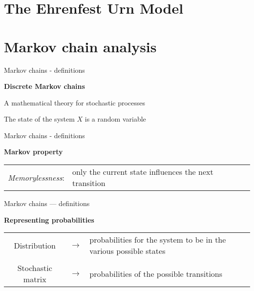 \documentclass[usenames,dvipsnames]{beamer}
\begin{document}
  \section{The Ehrenfest Urn Model}
  

  
  \section{Markov chain analysis}
  \begin{frame}{Markov chains - definitions}
    \begin{center}
      \Large{\textbf{Discrete Markov chains}}
    \end{center}
    A mathematical theory for stochastic processes

    The state of the system $X$ is a random variable

    \bigskip
    \begin{figure}
      
    \end{figure}
  \end{frame}

  \begin{frame}{Markov chains - definitions}
    \begin{center}
      \Large{\textbf{Markov property}}
    \end{center}
    \begin{table}
      \begin{tabularx}{\textwidth}{c >{\raggedright}X}
        \alert{\emph{Memorylessness}}: & only the current state influences the next transition \tabularnewline
      \end{tabularx}
    \end{table}
  \end{frame}

  \begin{frame}{Markov chains --- definitions}
    \begin{center}
      \Large \textbf{Representing probabilities}
    \end{center}

    \renewcommand{\tabularxcolumn}{m}
    \begin{table}
      \begin{tabularx}{0.9\textwidth}{c c >{\raggedright}X}
        \alert{Distribution} & $\rightarrow$ & probabilities for the system to be in the various possible states \tabularnewline
        & & \tabularnewline
        \alert{Stochastic matrix} & $\rightarrow$ & probabilities of the possible transitions
      \end{tabularx}

    \end{table}
    
  \end{frame}
\end{document}
